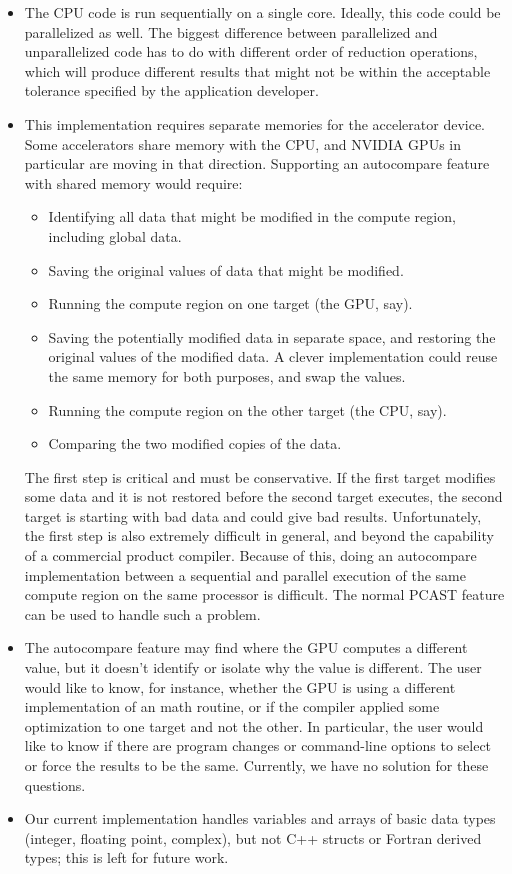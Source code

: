 \begin{itemize}
\item The CPU code is run sequentially on a single core.
Ideally, this code could be parallelized as well.
The biggest difference between parallelized and unparallelized code has to do with different order of reduction operations, which will produce different results that might not be within the acceptable tolerance specified by the application developer.
\item This implementation requires separate memories for the accelerator device.
Some accelerators share memory with the CPU, and NVIDIA GPUs in particular are moving in that direction.
Supporting an autocompare feature with shared memory would require:
\begin{itemize}
\item Identifying all data that might be modified in the compute region, including global data.
\item Saving the original values of data that might be modified.
\item Running the compute region on one target (the GPU, say).
\item Saving the potentially modified data in separate space, and restoring the original values of the modified data.
A clever implementation could reuse the same memory for both purposes, and swap the values.
\item Running the compute region on the other target (the CPU, say).
\item Comparing the two modified copies of the data.
\end{itemize}
The first step is critical and must be conservative.
If the first target modifies some data and it is not restored before the second target executes, the second target is starting with bad data and could give bad results.
Unfortunately, the first step is also extremely difficult in general, and beyond the capability of a commercial product compiler.
Because of this, doing an autocompare implementation between a sequential and parallel execution of the same compute region on the same processor is difficult.
The normal PCAST feature can be used to handle such a problem.
\item The autocompare feature may find where the GPU computes a different value, but it doesn't identify or isolate why the value is different.
The user would like to know, for instance, whether the GPU is using a different implementation of an math routine, or if the compiler applied some optimization to one target and not the other.
In particular, the user would like to know if there are program changes or command-line options to select or force the results to be the same.
Currently, we have no solution for these questions.
\item Our current implementation handles variables and arrays of basic data types (integer, floating point, complex), but not C++ structs or Fortran derived types; this is left for future work.
\end{itemize}

